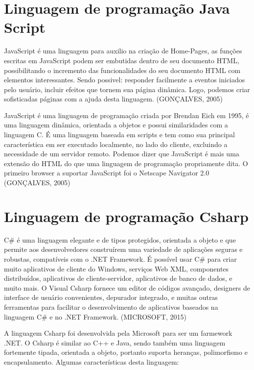 	
\section{Linguagem de programação Java Script}
\label{sec:Linguagem-de-programação-Java-Script}

JavaScript é uma linguagem para auxilio na criação de Home-Pages, as funções escritas em JavaScript podem ser embutidas dentro de seu documento HTML, possibilitando o incremento das funcionalidades do seu documento HTML com elementos interessantes. Sendo possivel: responder facilmente a eventos iniciados pelo usuário, incluir efeitos que tornem sua página dinâmica. Logo, podemos criar sofisticadas páginas com a ajuda desta linguagem. (GONÇALVES, 2005)

JavaScript é uma linguagem de programação criada por Brendan Eich em 1995, é uma linguagem dinâmica, orientada a objetos e possui similaridades com a linguagem C. 
É uma linguagem baseada em scripts e tem como sua principal característica em ser executado localmente, no lado do cliente, excluindo a necessidade de um servidor remoto.
Podemos dizer que JavaScript é mais uma extensão do HTML do que uma linguagem de programação propriamente dita. O primeiro browser a suportar JavaScript foi o Netscape Navigator 2.0 (GONÇALVES, 2005)

\section{Linguagem de programação Csharp}
\label{sec:Linguagem-de-programação-Csharp}

C# é uma linguagem elegante e de tipos protegidos, orientada a objeto e que permite aos desenvolvedores construírem uma variedade de aplicações seguras e robustas, compatíveis com o .NET Framework. É possível usar C# para criar muito aplicativos de cliente do Windows, serviços Web XML, componentes distribuídos, aplicativos de cliente-servidor, aplicativos de banco de dados, e muito mais. O Visual Csharp fornece um editor de códigos avançado, designers de interface de usuário convenientes, depurador integrado, e muitas outras ferramentas para facilitar o desenvolvimento de aplicativos baseados na linguagem C# e no .NET Framework. (MICROSOFT, 2015)

A linguagem Csharp foi desenvolvida pela Microsoft para ser um farmework .NET. 
O Csharp é similar ao C++ e Java, sendo também uma linguagem fortemente tipada, orientada a objeto, portanto suporta heranças, polimorfismo e encapsulamento. 
Algumas características desta linguagem: 

